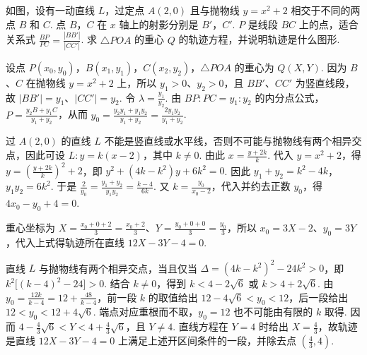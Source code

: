 \begin{problem}
如图，设有一动直线 \(L\)，过定点 \(A(2,0)\) 且与抛物线 \(y = x^2 + 2\) 相交于不同的两点 \(B\) 和 \(C\). 点 \(B\)，\(C\) 在 \(x\) 轴上的射影分别是 \(B'\)，\(C'\). \(P\) 是线段 \(BC\) 上的点，适合关系式 \(\frac{BP}{PC} = \frac{|BB'|}{|CC'|}\). 求 \(\triangle POA\) 的重心 \(Q\) 的轨迹方程，并说明轨迹是什么图形.

\end{problem}

\begin{solution}
设点 \(P(x_0,y_0)\)，\(B(x_1,y_1)\)，\(C(x_2,y_2)\)，\(\triangle POA\) 的重心为 \(Q(X,Y)\). 因为 \(B\)、\(C\) 在抛物线 \(y=x^2+2\) 上，所以 \(y_1>0\)、\(y_2>0\)，且 \(BB'\)、\(CC'\) 为竖直线段，故 \(|BB'|=y_1\)、\(|CC'|=y_2\). 令 \(\lambda=\frac{y_1}{y_2}\). 由 \(BP:PC=y_1:y_2\) 的内分点公式，
\(P=\frac{y_2B+y_1C}{y_1+y_2}\)，从而
\(y_0=\frac{y_2y_1+y_1y_2}{y_1+y_2}=\frac{2y_1y_2}{y_1+y_2}\).

过 \(A(2,0)\) 的直线 \(L\) 不能是竖直线或水平线，否则不可能与抛物线有两个相异交点，因此可设 \(L:y=k(x-2)\)，其中 \(k\neq0\). 由此 \(x=\frac{y+2k}{k}\). 代入 \(y=x^2+2\)，得
\(y=\left(\frac{y+2k}{k}\right)^2+2\)，即 \(y^2+(4k-k^2)y+6k^2=0\). 因此 \(y_1+y_2=k^2-4k\)，\(y_1y_2=6k^2\). 于是
\(\frac2{y_0}=\frac{y_1+y_2}{y_1y_2}=\frac{k-4}{6k}\). 又 \(k=\frac{y_0}{x_0-2}\)，代入并约去正数 \(y_0\)，得 \(4x_0-y_0+4=0\).

重心坐标为 \(X=\frac{x_0+0+2}{3}=\frac{x_0+2}{3}\)、\(Y=\frac{y_0+0+0}{3}=\frac{y_0}{3}\)，所以 \(x_0=3X-2\)、\(y_0=3Y\)，代入上式得轨迹所在直线
\(12X-3Y-4=0\).

直线 \(L\) 与抛物线有两个相异交点，当且仅当
\(\Delta=(4k-k^2)^2-24k^2>0\)，即 \(k^2\bigl[(k-4)^2-24\bigr]>0\). 结合 \(k\neq0\)，得到 \(k<4-2\sqrt6\) 或 \(k>4+2\sqrt6\). 由
\(y_0=\frac{12k}{k-4}=12+\frac{48}{k-4}\)，前一段 \(k\) 的取值给出 \(12-4\sqrt6<y_0<12\)，后一段给出 \(12<y_0<12+4\sqrt6\). 端点对应重根而不取，\(y_0=12\) 也不可能由有限的 \(k\) 取得. 因而
\(4-\frac43\sqrt6<Y<4+\frac43\sqrt6\)，且 \(Y\neq4\). 直线方程在 \(Y=4\) 时给出 \(X=\frac43\)，故轨迹是直线 \(12X-3Y-4=0\) 上满足上述开区间条件的一段，并除去点 \(\left(\frac43,4\right)\).
\end{solution}

